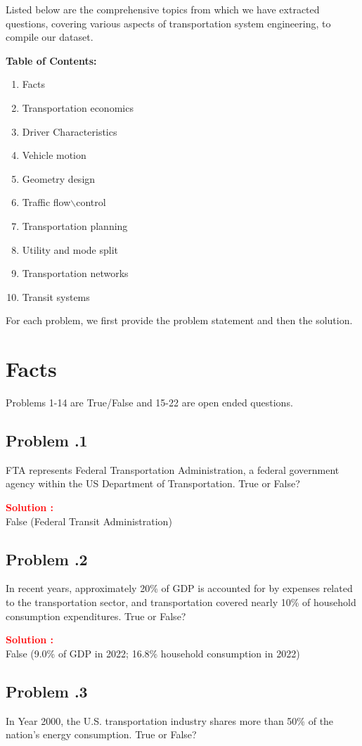 \documentclass[12pt]{article}
\newcommand{\customsubsection}[1]{
  \subsection*{Problem \thesection.#1}
}
\begin{document}
Listed below are the comprehensive topics from which we have extracted questions, covering various aspects of transportation system engineering, to compile our dataset.

\textbf{Table of Contents:}
\begin{enumerate}
\item Facts
\item Transportation economics 
\item Driver Characteristics
\item Vehicle motion
\item Geometry design
\item Traffic flow$\backslash$control 
\item Transportation planning
\item Utility and mode split
\item Transportation networks 
\item Transit systems 
\end{enumerate}

For each problem, we first provide the problem statement and then the solution.



\newpage


\section{Facts}
Problems 1-14 are True/False and 15-22 are open ended questions.

\customsubsection{1}
FTA represents Federal Transportation Administration, a federal government agency within the US Department of Transportation. True or False? 


\textbf{\textcolor{red}{Solution :}} \\
False (Federal Transit Administration)  

\newpage


\customsubsection{2}
In recent years, approximately 20\% of GDP is accounted for by expenses related to the transportation sector, and transportation covered nearly 10\% of household consumption expenditures. True or False? 


\textbf{\textcolor{red}{Solution :}} \\
False (9.0\% of GDP in 2022; 16.8\% household consumption in 2022)

\newpage

\customsubsection{3}
In Year 2000, the U.S. transportation industry shares more than 50\% of the nation’s energy consumption. True or False? 
\end{document}
